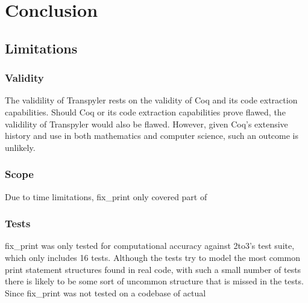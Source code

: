 \section{Conclusion}
\subsection{Limitations}

\subsubsection{Validity}
The validility of Transpyler rests on the validity of Coq and its code extraction capabilities. Should Coq or its code extraction capabilities prove flawed, the validility of Transpyler would also be flawed. However, given Coq's extensive history and use in both mathematics and computer science, such an outcome is unlikely.

\subsubsection{Scope}
Due to time limitations, fix\_print only covered part of 

\subsubsection{Tests}
fix\_print was only tested for computational accuracy against 2to3's test suite, which only includes 16 tests. Although the tests try to model the most common print statement structures found in real code, with such a small number of tests there is likely to be some sort of uncommon structure that is missed in the tests. Since fix\_print was not tested on a codebase of actual

